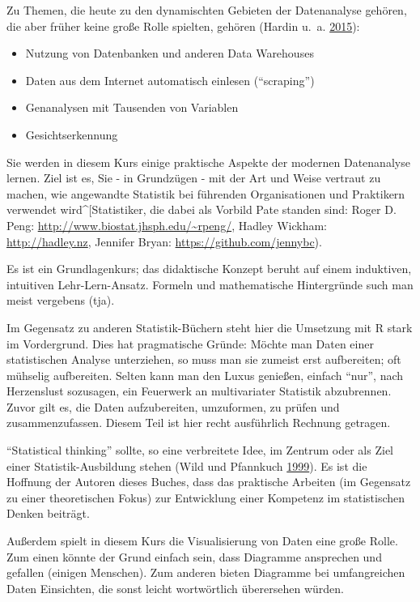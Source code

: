 \documentclass[12pt,ngerman,]{book}
\providecommand{\tightlist}{%
  \setlength{\itemsep}{0pt}\setlength{\parskip}{0pt}}
\begin{document}
Zu Themen, die heute zu den dynamischten Gebieten der Datenanalyse
gehören, die aber früher keine große Rolle spielten, gehören (Hardin
u.~a. \protect\hyperlink{ref-hardin2015data}{2015}):

\begin{itemize}
\tightlist
\item
  Nutzung von Datenbanken und anderen Data Warehouses
\item
  Daten aus dem Internet automatisch einlesen (``scraping'')
\item
  Genanalysen mit Tausenden von Variablen
\item
  Gesichtserkennung
\end{itemize}

Sie werden in diesem Kurs einige praktische Aspekte der modernen
Datenanalyse lernen. Ziel ist es, Sie - in Grundzügen - mit der Art und
Weise vertraut zu machen, wie angewandte Statistik bei führenden
Organisationen und Praktikern verwendet wird\^{}{[}Statistiker, die
dabei als Vorbild Pate standen sind: Roger D. Peng:
\url{http://www.biostat.jhsph.edu/~rpeng/}, Hadley Wickham:
\url{http://hadley.nz}, Jennifer Bryan:
\url{https://github.com/jennybc}).

Es ist ein Grundlagenkurs; das didaktische Konzept beruht auf einem
induktiven, intuitiven Lehr-Lern-Ansatz. Formeln und mathematische
Hintergründe such man meist vergebens (tja).

Im Gegensatz zu anderen Statistik-Büchern steht hier die Umsetzung mit R
stark im Vordergrund. Dies hat pragmatische Gründe: Möchte man Daten
einer statistischen Analyse unterziehen, so muss man sie zumeist erst
aufbereiten; oft mühselig aufbereiten. Selten kann man den Luxus
genießen, einfach ``nur'', nach Herzenslust sozusagen, ein Feuerwerk an
multivariater Statistik abzubrennen. Zuvor gilt es, die Daten
aufzubereiten, umzuformen, zu prüfen und zusammenzufassen. Diesem Teil
ist hier recht ausführlich Rechnung getragen.

``Statistical thinking'' sollte, so eine verbreitete Idee, im Zentrum
oder als Ziel einer Statistik-Ausbildung stehen (Wild und Pfannkuch
\protect\hyperlink{ref-wild1999statistical}{1999}). Es ist die Hoffnung
der Autoren dieses Buches, dass das praktische Arbeiten (im Gegensatz zu
einer theoretischen Fokus) zur Entwicklung einer Kompetenz im
statistischen Denken beiträgt.

Außerdem spielt in diesem Kurs die Visualisierung von Daten eine große
Rolle. Zum einen könnte der Grund einfach sein, dass Diagramme
ansprechen und gefallen (einigen Menschen). Zum anderen bieten Diagramme
bei umfangreichen Daten Einsichten, die sonst leicht wortwörtlich
überersehen würden.
\end{document}
